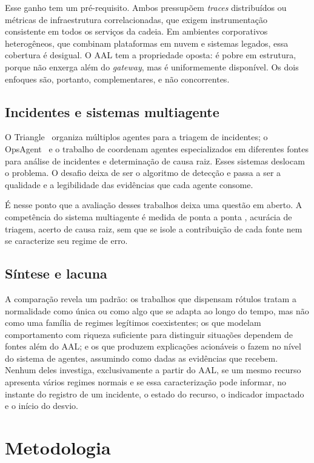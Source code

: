 \documentclass[sigconf,nonacm]{acmart}
\begin{document}
Esse ganho tem um pré-requisito. Ambos pressupõem \emph{traces} distribuídos ou métricas de infraestrutura correlacionadas, que exigem instrumentação consistente em todos os serviços da cadeia. Em ambientes corporativos heterogêneos, que combinam plataformas em nuvem e sistemas legados, essa cobertura é desigual. O AAL tem a propriedade oposta: é pobre em estrutura, porque não enxerga além do \emph{gateway}, mas é uniformemente disponível. Os dois enfoques são, portanto, complementares, e não concorrentes.


\subsection{Incidentes e sistemas multiagente}
O Triangle~\citep{yu2025triangle} organiza múltiplos agentes para a triagem de incidentes; o OpsAgent~\citep{luo2025opsagent} e o trabalho de \citet{zhang2025isre} coordenam agentes especializados em diferentes fontes para análise de incidentes e determinação de causa raiz. Esses sistemas deslocam o problema. O desafio deixa de ser o algoritmo de detecção e passa a ser a qualidade e a legibilidade das evidências que cada agente consome.

É nesse ponto que a avaliação desses trabalhos deixa uma questão em aberto. A competência do sistema multiagente é medida de ponta a ponta , acurácia de triagem, acerto de causa raiz, sem que se isole a contribuição de cada fonte nem se caracterize seu regime de erro. 

\subsection{Síntese e lacuna}
A comparação revela um padrão: os trabalhos que dispensam rótulos tratam a normalidade como única ou como algo que se adapta ao longo do tempo, mas não como uma família de regimes legítimos coexistentes; os que modelam comportamento com riqueza suficiente para distinguir situações dependem de fontes além do AAL; e os que produzem explicações acionáveis o fazem no nível do sistema de agentes, assumindo como dadas as evidências que recebem. Nenhum deles investiga, exclusivamente a partir do AAL, se um mesmo recurso apresenta vários regimes normais e se essa caracterização pode informar, no instante do registro de um incidente, o estado do recurso, o indicador impactado e o início do desvio.

\section{Metodologia}\label{sec:metodologia}
\end{document}
